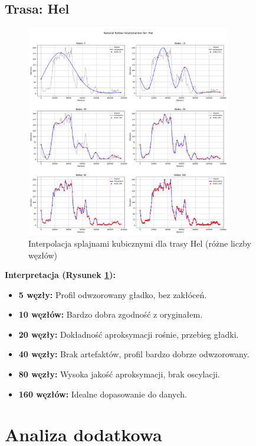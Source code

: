 \documentclass[11pt,a4paper]{article}
\begin{document}
\subsection{Trasa: Hel}
\begin{figure}[H]
    \centering
    \includegraphics[width=0.8\textwidth]{plots/Hel_Spline_basic.png}
    \caption{Interpolacja splajnami kubicznymi dla trasy Hel (różne liczby węzłów)}
    \label{fig:hej_splajny}
\end{figure}
\textbf{Interpretacja (Rysunek \ref{fig:hej_splajny}):} 
\begin{itemize}
    \item \textbf{5 węzły:} Profil odwzorowany gładko, bez zakłóceń.
    \item \textbf{10 węzłów:} Bardzo dobra zgodność z oryginałem.
    \item \textbf{20 węzły:} Dokładność aproksymacji rośnie, przebieg gładki.
    \item \textbf{40 węzły:} Brak artefaktów, profil bardzo dobrze odwzorowany.
    \item \textbf{80 węzły:} Wysoka jakość aproksymacji, brak oscylacji.
    \item \textbf{160 węzłów:} Idealne dopasowanie do danych.
\end{itemize}

\section{Analiza dodatkowa}
\end{document}
